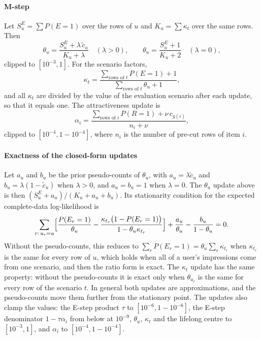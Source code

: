 \documentclass[preprint,12pt,authoryear]{elsarticle}
\begin{document}
\paragraph{M-step} Let $S^E_u=\sum P(E=1)$ over the rows of $u$ and $K_u=\sum\kappa_t$ over the same rows. Then
\[
\theta_u=\frac{S^E_u+\lambda\,\tilde c_u}{K_u+\lambda}\quad(\lambda>0),\qquad \theta_u=\frac{S^E_u+1}{K_u+2}\quad(\lambda=0),
\]
clipped to $[10^{-3},1]$. For the scenario factors,
\[
\kappa_t=\frac{\sum_{\text{rows of }t}P(E=1)+1}{\sum_{\text{rows of }t}\theta_{u}+1},
\]
and all $\kappa_t$ are divided by the value of the evaluation scenario after each update, so that it equals one. The attractiveness update is
\[
\alpha_i=\frac{\sum_{\text{rows of }i}P(R=1)+\nu\,c_{g(i)}}{n_i+\nu},
\]
clipped to $[10^{-4},1-10^{-4}]$, where $n_i$ is the number of pre-cut rows of item $i$.

\paragraph{Exactness of the closed-form updates} Let $a_u$ and $b_u$ be the prior pseudo-counts of $\theta_u$, with $a_u=\lambda\tilde c_u$ and
$b_u=\lambda(1-\tilde c_u)$ when $\lambda>0$, and $a_u=b_u=1$ when $\lambda=0$. The $\theta_u$ update above is then
$(S^E_u+a_u)/(K_u+a_u+b_u)$. Its stationarity condition for the expected complete-data log-likelihood is
\[
\sum_{r:\,u_r=u}\Bigl[\frac{P(E_r=1)}{\theta_u}-\frac{\kappa_{t_r}\bigl(1-P(E_r=1)\bigr)}{1-\theta_u\kappa_{t_r}}\Bigr]+\frac{a_u}{\theta_u}-\frac{b_u}{1-\theta_u}=0.
\]
Without the pseudo-counts, this reduces to $\sum_r P(E_r=1)=\theta_u\sum_r\kappa_{t_r}$ when $\kappa_{t_r}$ is the same for every row of $u$, which holds
when all of a user's impressions come from one scenario, and then the ratio form is exact. The $\kappa_t$ update has the same property: without the
pseudo-counts it is exact only when $\theta_{u_r}$ is the same for every row of the scenario $t$. In general both updates are approximations, and
the pseudo-counts move them further from the stationary point. The updates also clamp the values: the E-step product $\tau$ to
$[10^{-6},1-10^{-6}]$, the E-step denominator $1-\tau\alpha_i$ from below at $10^{-9}$, $\theta_u$, $\kappa_t$ and the lifelong centre to
$[10^{-3},1]$, and $\alpha_i$ to $[10^{-4},1-10^{-4}]$.
\end{document}
